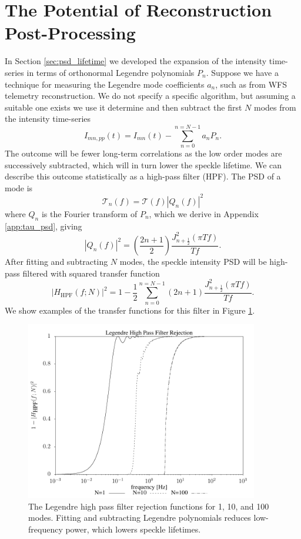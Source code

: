 \documentclass[10pt,preprint]{aastex631}
\begin{document}
\section{The Potential of Reconstruction Post-Processing}
\label{sec:reconstruction}
In Section \ref{sec:psd_lifetime} we developed the expansion of the intensity time-series in terms of orthonormal Legendre polynomials $P_n$.  Suppose we have a technique for measuring the Legendre mode coefficients $a_n$, such as from WFS telemetry reconstruction.  We do not specify a specific algorithm, but assuming a suitable one exists we use it determine and then subtract the first $N$ modes from the intensity time-series 
\begin{equation}
I_{mn,pp}(t) = I_{mn}(t) - \sum_{n=0}^{n=N-1} a_n P_n. 
\end{equation}
The outcome will be fewer long-term correlations as the low order modes are successively subtracted, which will in turn lower the speckle lifetime.  We can describe this outcome statistically as a high-pass filter (HPF).  The PSD of a mode is
\begin{equation}
\mathcal{T}_n(f) = \mathcal{T}(f) \left|Q_n(f)\right|^2
\end{equation}
where ${Q}_n$ is the Fourier transform of $P_n$, which we derive in Appendix \ref{app:tau_psd}, giving
\begin{equation}
 \left|Q_n(f)\right|^2 = \left(\frac{2n+1}{2}\right)\frac{J_{n+\frac{1}{2}}^2(\pi T f)}{T f}.
\end{equation}
After fitting and subtracting $N$ modes, the speckle intensity PSD will be high-pass filtered with squared transfer function
\begin{equation}
\left| H_\mathrm{HPF}(f;N) \right| ^2 = 1 - \frac{1}{2}\sum_{n=0}^{n=N-1} (2n+1) \frac{J_{n+\frac{1}{2}}^2(\pi T f)}{T f}.
\end{equation}
We show examples of the transfer functions for this filter in Figure \ref{fig:leghpf}.  

\begin{figure}
\centering
\includegraphics[width=4in]{hpf.pdf}
\caption{The Legendre high pass filter rejection functions for 1, 10, and 100 modes. Fitting and subtracting Legendre polynomials reduces low-frequency power, which lowers speckle lifetimes.\label{fig:leghpf}}
\end{figure}
\end{document}
